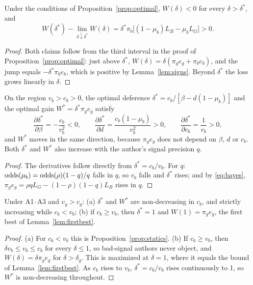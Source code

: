 \begin{proposition}\label{prop:cliff}
Under the conditions of Proposition~\ref{prop:optimal}, $W(\delta) < 0$ for every
$\delta > \delta^*$, and
\[
  W(\delta^*) - \lim_{\delta \downarrow \delta^*} W(\delta)
  = \delta^* \pi_b \big[(1-\mu_b) L_B - \mu_b L_G\big] > 0 .
\]
\end{proposition}

\begin{proof}
Both claims follow from the third interval in the proof of Proposition~\ref{prop:optimal}: just
above $\delta^*$, $W(\delta) = \delta(\pi_g e_g + \pi_b e_b)$, and the jump equals
$-\delta^* \pi_b e_b$, which is positive by Lemma~\ref{lem:signs}. Beyond $\delta^*$ the loss
grows linearly in $\delta$.
\end{proof}

\begin{proposition}\label{prop:statics}
On the region $v_b > c_b > 0$, the optimal deference $\delta^* = c_b / [\beta - d(1-\mu_b)]$ and
the optimal gain $W^* = \delta^* \pi_g e_g$ satisfy
\[
  \frac{\partial \delta^*}{\partial \beta} = -\frac{c_b}{v_b^2} < 0, \qquad
  \frac{\partial \delta^*}{\partial d} = \frac{c_b (1-\mu_b)}{v_b^2} > 0, \qquad
  \frac{\partial \delta^*}{\partial c_b} = \frac{1}{v_b} > 0,
\]
and $W^*$ moves in the same direction, because $\pi_g e_g$ does not depend on $\beta$, $d$ or
$c_b$. Both $\delta^*$ and $W^*$ also increase with the author's signal precision $q$.
\end{proposition}

\begin{proof}
The derivatives follow directly from $\delta^* = c_b / v_b$. For $q$:
$\operatorname{odds}(\mu_b) = \operatorname{odds}(\rho)(1-q)/q$ falls in $q$, so $v_b$ falls and $\delta^*$ rises; and by
\eqref{eq:bayes}, $\pi_g e_g = \rho q L_G - (1-\rho)(1-q) L_B$ rises in $q$.
\end{proof}

\begin{proposition}\label{prop:evidence}
Under A1--A3 and $v_g > c_g$:
(a) $\delta^*$ and $W^*$ are non-decreasing in $c_b$, and strictly increasing while $c_b < v_b$;
(b) if $c_b \ge v_b$, then $\delta^* = 1$ and $W(1) = \pi_g e_g$, the first best of
Lemma~\ref{lem:firstbest}.
\end{proposition}

\begin{proof}
(a) For $c_b < v_b$ this is Proposition~\ref{prop:statics}.
(b) If $c_b \ge v_b$, then $\delta v_b \le v_b \le c_b$ for every $\delta \le 1$, so bad-signal
authors never object, and $W(\delta) = \delta \pi_g e_g$ for $\delta > \delta_g$. This is
maximized at $\delta = 1$, where it equals the bound of Lemma~\ref{lem:firstbest}. As $c_b$ rises
to $v_b$, $\delta^* = c_b/v_b$ rises continuously to 1, so $W^*$ is non-decreasing throughout.
\end{proof}

